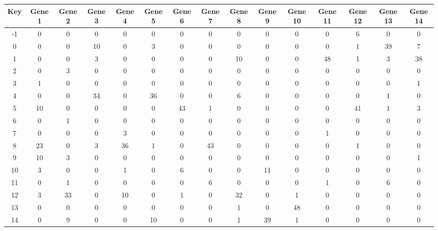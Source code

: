 \begin{tabular}{|c|c|c|c|c|c|c|c|c|c|c|c|c|c|c|}
\hline
Key & Gene 1 & Gene 2 & Gene 3 & Gene 4 & Gene 5 & Gene 6 & Gene 7 & Gene 8 & Gene 9 & Gene 10 & Gene 11 & Gene 12 & Gene 13 & Gene 14 \\
\hline
-1 & 0 & 0 & 0 & 0 & 0 & 0 & 0 & 0 & 0 & 0 & 0 & 6 & 0 & 0 \\
0 & 0 & 0 & 10 & 0 & 3 & 0 & 0 & 0 & 0 & 0 & 0 & 1 & 39 & 7 \\
1 & 0 & 0 & 3 & 0 & 0 & 0 & 0 & 10 & 0 & 0 & 48 & 1 & 3 & 38 \\
2 & 0 & 3 & 0 & 0 & 0 & 0 & 0 & 0 & 0 & 0 & 0 & 0 & 0 & 0 \\
3 & 1 & 0 & 0 & 0 & 0 & 0 & 0 & 0 & 0 & 0 & 0 & 0 & 0 & 1 \\
4 & 0 & 0 & 34 & 0 & 36 & 0 & 0 & 6 & 0 & 0 & 0 & 0 & 1 & 0 \\
5 & 10 & 0 & 0 & 0 & 0 & 43 & 1 & 0 & 0 & 0 & 0 & 41 & 1 & 3 \\
6 & 0 & 1 & 0 & 0 & 0 & 0 & 0 & 0 & 0 & 0 & 0 & 0 & 0 & 0 \\
7 & 0 & 0 & 0 & 3 & 0 & 0 & 0 & 0 & 0 & 0 & 1 & 0 & 0 & 0 \\
8 & 23 & 0 & 3 & 36 & 1 & 0 & 43 & 0 & 0 & 0 & 0 & 1 & 0 & 0 \\
9 & 10 & 3 & 0 & 0 & 0 & 0 & 0 & 0 & 0 & 0 & 0 & 0 & 0 & 1 \\
10 & 3 & 0 & 0 & 1 & 0 & 6 & 0 & 0 & 11 & 0 & 0 & 0 & 0 & 0 \\
11 & 0 & 1 & 0 & 0 & 0 & 0 & 6 & 0 & 0 & 0 & 1 & 0 & 6 & 0 \\
12 & 3 & 33 & 0 & 10 & 0 & 1 & 0 & 32 & 0 & 1 & 0 & 0 & 0 & 0 \\
13 & 0 & 0 & 0 & 0 & 0 & 0 & 0 & 1 & 0 & 48 & 0 & 0 & 0 & 0 \\
14 & 0 & 9 & 0 & 0 & 10 & 0 & 0 & 1 & 39 & 1 & 0 & 0 & 0 & 0 \\
\hline
\end{tabular}